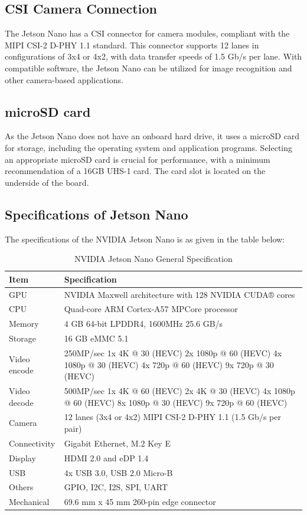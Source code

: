 \subsection{CSI Camera Connection}

The Jetson Nano has a CSI connector for camera modules, compliant with the MIPI CSI-2 D-PHY 1.1 standard. This connector supports 12 lanes in configurations of 3x4 or 4x2, with data transfer speeds of 1.5 Gb/s per lane. With compatible software, the Jetson Nano can be utilized for image recognition and other camera-based applications.

\subsection{microSD card}


As the Jetson Nano does not have an onboard hard drive, it uses a microSD card for storage, including the operating system and application programs. Selecting an appropriate microSD card is crucial for performance, with a minimum recommendation of a 16GB UHS-1 card. The card slot is located on the underside of the board. \cite{NVI:2019}


\subsection{Specifications of Jetson Nano} 
The specifications of the NVIDIA Jetson Nano is as given in the table below:\\
\begin{table}
	\begin{tabular}{||m{5cm}|m{10cm}||}
		\hline
		\textbf{Item} & \textbf{Specification}\\
		\hline
		GPU & NVIDIA Maxwell architecture with 128 NVIDIA CUDA® cores\\
		\hline
		CPU & Quad-core ARM Cortex-A57 MPCore processor\\
		\hline
		Memory & 4 GB 64-bit LPDDR4, 1600MHz 25.6 GB/s\\
		\hline
		Storage & 16 GB eMMC 5.1\\
		\hline
		Video encode & 250MP/sec
		1x 4K @ 30 (HEVC)
		2x 1080p @ 60 (HEVC)
		4x 1080p @ 30 (HEVC)
		4x 720p @ 60 (HEVC)
		9x 720p @ 30 (HEVC)\\
		\hline
		Video decode & 500MP/sec
		1x 4K @ 60 (HEVC)
		2x 4K @ 30 (HEVC)
		4x 1080p @ 60 (HEVC)
		8x 1080p @ 30 (HEVC)
		9x 720p @ 60 (HEVC)\\
		\hline
		Camera & 12 lanes (3x4 or 4x2) MIPI CSI-2 D-PHY 1.1 (1.5 Gb/s per pair)\\
		\hline
		Connectivity & Gigabit Ethernet, M.2 Key E\\
		\hline
		Display & HDMI 2.0 and eDP 1.4\\
		\hline
		USB & 4x USB 3.0, USB 2.0 Micro-B\\
		\hline
		Others & GPIO, I2C, I2S, SPI, UART\\
		\hline
		Mechanical & 69.6 mm x 45 mm
		260-pin edge connector\\
		\hline
	\end{tabular}
	\caption{\label{tab:NVIDIA Jetson Nano Specification} NVIDIA Jetson Nano General Specification}
\end{table}


